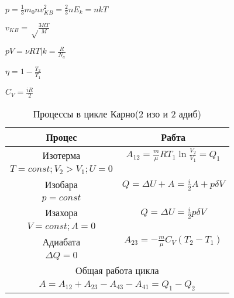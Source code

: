 \documentclass{article}
\begin{document}
$p= \frac{1}{3}m_0nv_{KB}^{2} = \frac{2}{3}nE_k=nkT $ 

$v_{KB}= \sqrt \frac{3RT}{M} $ 

$ pV= \nu RT \vert k=\frac{R}{N_a}$

$ \eta = 1 - \frac{T_2}{T_1}  $

$ C_V = \frac{iR}{2} $

\begin{table}[H] 
\caption{\label{tab:summary}Процессы в цикле Карно(2 изо и 2 адиб)} 
\begin{center} 
\begin{tabular}{|c|c|} 
\hline 
Процес & Рабта \\ 
\hline 
Изотерма & $ A_{12}=\frac{m}{\mu}RT_1\ln{\frac{V_2}{V_1}}=Q_1$ \\ 
$ T=const; V_2>V_1; U=0 $ \\
\hline 
Изобара &  $ Q = \Delta{U} + A= \frac{i}{2}A+p\delta{V} $ \\
$ p = const $ \\
\hline 
Изахора &  $ Q = \Delta{U}= \frac{i}{2}p\delta{V} $ \\
$ V = const; A=0 $ \\
\hline
Адиабата &  $ A_{23} = -\frac{m}{\mu}C_V(T_2-T_1) $ \\
$ \Delta{Q}=0 $ \\
\hline  
\multicolumn{2}{|c|}{Общая работа цикла} \\ 
\hline 
\multicolumn{2}{|c|}{$A=A_{12}+A_{23}-A_{43}-A_{41}= Q_1-Q_2$ }\\ 
\hline 
\end{tabular} 
\end{center} 
\end{table}
\end{document}
